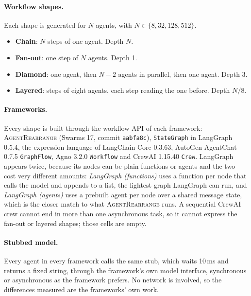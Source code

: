\documentclass[11pt]{article}
\newcommand{\code}[1]{\texttt{#1}}
\newcommand{\AR}{\textsc{AgentRearrange}}
\begin{document}
\paragraph{Workflow shapes.}
Each shape is generated for $N$ agents, with $N \in \{8, 32, 128, 512\}$.
\begin{itemize}
  \item \textbf{Chain}: $N$ steps of one agent. Depth $N$.
  \item \textbf{Fan-out}: one step of $N$ agents. Depth 1.
  \item \textbf{Diamond}: one agent, then $N-2$ agents in parallel, then one agent. Depth 3.
  \item \textbf{Layered}: steps of eight agents, each step reading the one before. Depth $N/8$.
\end{itemize}

\paragraph{Frameworks.}
Every shape is built through the workflow API of each framework: \AR{} (Swarms 17, commit \code{aabfa8c}), \code{StateGraph} in LangGraph 0.5.4, the expression language of LangChain Core 0.3.63, AutoGen AgentChat 0.7.5 \code{GraphFlow}, Agno 3.2.0 \code{Workflow} and CrewAI 1.15.40 \code{Crew}. LangGraph appears twice, because its nodes can be plain functions or agents and the two cost very different amounts: \emph{LangGraph (functions)} uses a function per node that calls the model and appends to a list, the lightest graph LangGraph can run, and \emph{LangGraph (agents)} uses a prebuilt agent per node over a shared message state, which is the closer match to what \AR{} runs. A sequential CrewAI crew cannot end in more than one asynchronous task, so it cannot express the fan-out or layered shapes; those cells are empty.

\paragraph{Stubbed model.}
Every agent in every framework calls the same stub, which waits 10\,ms and returns a fixed string, through the framework's own model interface, synchronous or asynchronous as the framework prefers. No network is involved, so the differences measured are the frameworks' own work.
\end{document}
